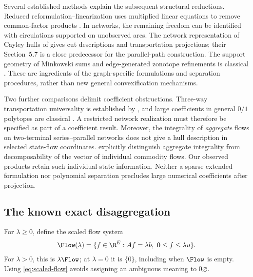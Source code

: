 Several established methods explain the subsequent structural reductions.
Reduced reformulation--linearization uses multiplied linear equations to
remove common-factor products \citep{LibertiPantelides2006}. In networks,
the remaining freedom can be identified with circulations supported on
unobserved arcs. The network representation of Cayley hulls of
\citet{KisHorvath2022} gives cut descriptions and transportation projections;
their Section~5.7 is a close predecessor for the parallel-path construction.
The support geometry of Minkowski sums and edge-generated zonotope
refinements is classical \citep{GritzmannSturmfels1993,OnnRothblum2004}.
These are ingredients of the graph-specific formulations and separation
procedures, rather than new general convexification mechanisms.

Two further comparisons delimit coefficient obstructions. Three-way
transportation universality is established by \citet{DeLoeraOnn2006}, and
large coefficients in general $0/1$ polytopes are classical
\citep{AlonVu1997}. A restricted network realization must therefore be
specified as part of a coefficient result. Moreover, the integrality of
\emph{aggregate} flows on two-terminal series--parallel networks does not
give a hull description in selected state-flow coordinates.
\citet[Remark~1]{AlmoghrabiSkutellaWarode2026} explicitly distinguish
aggregate integrality from decomposability of the vector of individual
commodity flows. Our observed products retain such individual-state
information. Neither a sparse extended formulation nor polynomial separation
precludes large numerical coefficients after projection.

\subsection{The known exact disaggregation}\label{subsec:disaggregation}
For $\lambda\ge0$, define the scaled flow system
\begin{equation}\label{eq:scaled-flow}
 \Flow(\lambda)=\{f\in\R^E:Af=\lambda b,\ 0\le f\le\lambda u\}.
\end{equation}
For $\lambda>0$, this is $\lambda\Flow$; at $\lambda=0$ it is $\{0\}$,
including when $\Flow$ is empty. Using \eqref{eq:scaled-flow} avoids assigning
an ambiguous meaning to $0\varnothing$.

